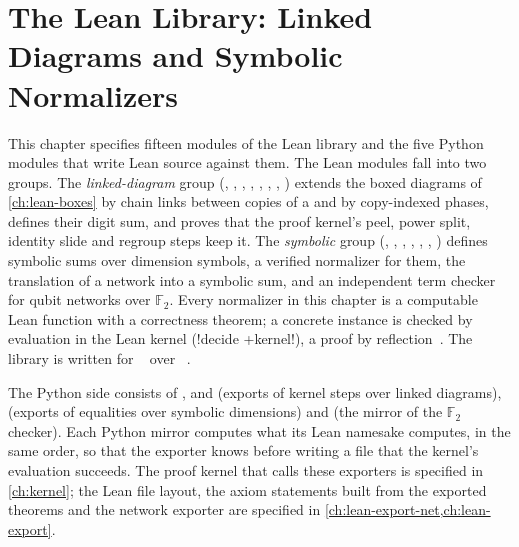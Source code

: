 \chapter{The Lean Library: Linked Diagrams and Symbolic Normalizers}\label{ch:lean-sym}

This chapter specifies fifteen modules of the Lean library  and the five Python modules that write Lean source against them. The Lean modules fall into two groups. The \emph{linked-diagram} group (, , , , , , , ) extends the boxed diagrams of \cref{ch:lean-boxes} by chain links between copies of a \bbox{} and by copy-indexed phases, defines their digit sum, and proves that the proof kernel's peel, power split, identity slide and regroup steps keep it. The \emph{symbolic} group (, , , , , , ) defines symbolic sums over dimension symbols, a verified normalizer for them, the translation of a network into a symbolic sum, and an independent term checker for qubit networks over $\mathbb{F}_2$. Every normalizer in this chapter is a computable Lean function with a correctness theorem; a concrete instance is checked by evaluation in the Lean kernel (\lean!decide +kernel!), a proof by reflection~\cite{boutin1997reflection}. The library is written for ~\cite{demoura2021lean4} over ~\cite{mathlib2020}.

The Python side consists of ,  and  (exports of kernel steps over linked diagrams),  (exports of equalities over symbolic dimensions) and  (the mirror of the $\mathbb{F}_2$ checker). Each Python mirror computes what its Lean namesake computes, in the same order, so that the exporter knows before writing a file that the kernel's evaluation succeeds. The proof kernel that calls these exporters is specified in \cref{ch:kernel}; the Lean file layout, the axiom statements built from the exported theorems and the network exporter  are specified in \cref{ch:lean-export-net,ch:lean-export}.

